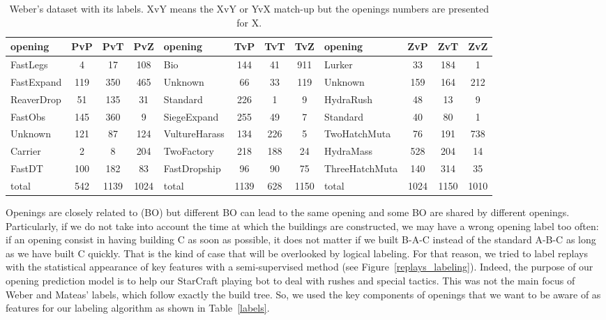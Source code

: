 \begin{table}[!h]
\begin{center}
\begin{footnotesize}
\begin{tabular}{|l|c|c|c|l|c|c|c|l|c|c|c|}
\hline
opening & PvP & PvT & PvZ & opening & TvP & TvT & TvZ & opening & ZvP & ZvT & ZvZ \\
\hline
FastLegs & 4 & 17 & 108 & Bio & 144 & 41 & 911 & Lurker & 33 & 184 & 1 \\
FastExpand & 119 & 350 & 465 & Unknown & 66 & 33 & 119 & Unknown & 159 & 164 & 212 \\
ReaverDrop & 51 & 135 & 31 & Standard & 226 & 1 & 9 & HydraRush & 48 & 13 & 9 \\
FastObs & 145 & 360 & 9 & SiegeExpand & 255 & 49 & 7 & Standard & 40 & 80 & 1 \\
Unknown & 121 & 87 & 124 & VultureHarass & 134 & 226 & 5 & TwoHatchMuta & 76 & 191 & 738 \\
Carrier & 2 & 8 & 204 & TwoFactory & 218 & 188 & 24 &  HydraMass & 528 & 204 & 14 \\
FastDT & 100 & 182 & 83 & FastDropship & 96 & 90 & 75 & ThreeHatchMuta & 140 & 314 & 35 \\
\hline
total & 542 & 1139 & 1024 & total & 1139 & 628 & 1150 & total & 1024 & 1150 & 1010 \\
\hline
\end{tabular}
\end{footnotesize}
\end{center}
\caption{Weber's dataset with its labels. XvY means the XvY or YvX match-up but the openings numbers are presented for X.}
\label{fig:weberdatasetnumbers}
\end{table}

Openings are closely related to  (BO) but different BO can lead to the same opening and some BO are shared by different openings. Particularly, if we do not take into account the time at which the buildings are constructed, we may have a wrong opening label too often: if an opening consist in having building C as soon as possible, it does not matter if we built B-A-C instead of the standard A-B-C as long as we have built C quickly. That is the kind of case that will be overlooked by logical labeling. For that reason, we tried to label replays with the statistical appearance of key features with a semi-supervised method (see Figure~\ref{replays_labeling}). Indeed, the purpose of our opening prediction model is to help our StarCraft playing bot to deal with rushes and special tactics. This was not the main focus of Weber and Mateas' labels, which follow exactly the build tree. So, we used the key components of openings that we want to be aware of as features for our labeling algorithm as shown in Table~\ref{labels}.

